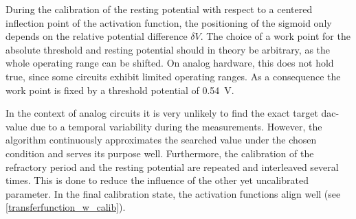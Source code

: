 During the calibration of the resting potential with respect to a centered inflection point of the activation function, the positioning of the sigmoid only depends on the relative potential difference $\delta V$. The choice of a work point for the absolute threshold and resting potential should in theory be arbitrary, as the whole operating range can be shifted. On analog hardware, this does not hold true, since some circuits exhibit limited operating ranges. As a consequence the work point is fixed by a threshold potential of \SI{0.54}{\V}.


In the context of analog circuits it is very unlikely to find the exact target \gls{dac}-value due to a temporal variability during the measurements. However, the algorithm continuously approximates the searched value under the chosen condition and serves its purpose well. Furthermore, the calibration of the refractory period and the resting potential are repeated and interleaved several times. This is done to reduce the influence of the other yet uncalibrated parameter. In the final calibration state, the activation functions align well (see \cref{transferfunction_w_calib}).

